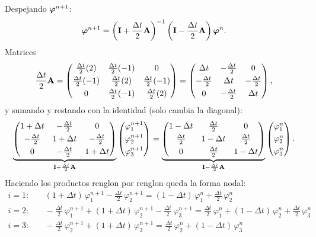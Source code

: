 Despejando $\bm{\varphi}^{n+1}$:
\[
\bm{\varphi}^{n+1} = \left(\mathbf{I} + \frac{\Delta t}{2}\mathbf{A}\right)^{-1}\left(\mathbf{I} - \frac{\Delta t}{2}\mathbf{A}\right)\bm{\varphi}^{n}.
\]
Matrices 
\[
  \frac{\Delta t}{2}\mathbf{A}
  = \begin{pmatrix}
      \frac{\Delta t}{2}(2) & \frac{\Delta t}{2}(-1) & 0\\[3pt]
      \frac{\Delta t}{2}(-1) & \frac{\Delta t}{2}(2) & \frac{\Delta t}{2}(-1)\\[3pt]
      0 & \frac{\Delta t}{2}(-1) & \frac{\Delta t}{2}(2)
    \end{pmatrix}
  = \begin{pmatrix}
      \Delta t & -\frac{\Delta t}{2} & 0\\[3pt]
      -\frac{\Delta t}{2} & \Delta t & -\frac{\Delta t}{2}\\[3pt]
      0 & -\frac{\Delta t}{2} & \Delta t
    \end{pmatrix},
\]
y sumando y restando con la identidad (solo cambia la diagonal):
\[
  \underbrace{\begin{pmatrix}
      1 + \Delta t & -\frac{\Delta t}{2} & 0\\[3pt]
      -\frac{\Delta t}{2} & 1 + \Delta t & -\frac{\Delta t}{2}\\[3pt]
      0 & -\frac{\Delta t}{2} & 1 + \Delta t
  \end{pmatrix}}_{\mathbf{I} + \frac{\Delta t}{2}\mathbf{A}}
  \begin{pmatrix} \varphi_1^{n+1}\\[3pt] \varphi_2^{n+1}\\[3pt] \varphi_3^{n+1} \end{pmatrix}
  =
  \underbrace{\begin{pmatrix}
      1 - \Delta t & \frac{\Delta t}{2} & 0\\[3pt]
      \frac{\Delta t}{2} & 1 - \Delta t & \frac{\Delta t}{2}\\[3pt]
      0 & \frac{\Delta t}{2} & 1 - \Delta t
  \end{pmatrix}}_{\mathbf{I} - \frac{\Delta t}{2}\mathbf{A}}
  \begin{pmatrix} \varphi_1^{n}\\[3pt] \varphi_2^{n}\\[3pt] \varphi_3^{n} \end{pmatrix}.
\]
Haciendo los productos renglon por renglon queda la forma nodal:
\begin{align*}
  i = 1:&\quad (1 + \Delta t)\,\varphi_1^{n+1} - \tfrac{\Delta t}{2}\,\varphi_2^{n+1}
          = (1 - \Delta t)\,\varphi_1^{n} + \tfrac{\Delta t}{2}\,\varphi_2^{n}\\
  i = 2:&\quad -\tfrac{\Delta t}{2}\,\varphi_1^{n+1} + (1 + \Delta t)\,\varphi_2^{n+1} - \tfrac{\Delta t}{2}\,\varphi_3^{n+1}
          = \tfrac{\Delta t}{2}\,\varphi_1^{n} + (1 - \Delta t)\,\varphi_2^{n} + \tfrac{\Delta t}{2}\,\varphi_3^{n}\\
  i = 3:&\quad -\tfrac{\Delta t}{2}\,\varphi_2^{n+1} + (1 + \Delta t)\,\varphi_3^{n+1}
          = \tfrac{\Delta t}{2}\,\varphi_2^{n} + (1 - \Delta t)\,\varphi_3^{n}
\end{align*}


